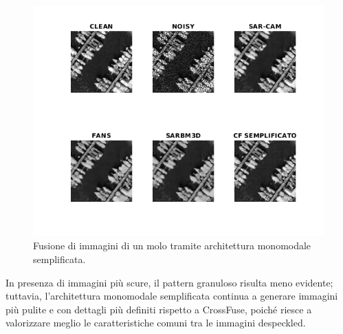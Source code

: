 \begin{figure}[H] 
  \centering
  \includegraphics[width=1.0\textwidth]{utils/CFLharbor03.png}
  \caption{Fusione di immagini di un molo tramite architettura monomodale semplificata.}
  \label{fig:harbor03CFL}
\end{figure}In presenza di immagini più scure, il pattern granuloso risulta meno evidente; 
tuttavia, l’architettura monomodale semplificata continua a generare immagini più pulite e
 con dettagli più definiti rispetto a CrossFuse, poiché riesce a valorizzare meglio le 
 caratteristiche comuni tra le immagini despeckled.